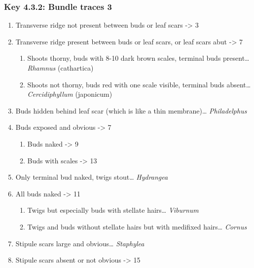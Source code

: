 \documentclass[openany]{book}
\providecommand{\tightlist}{%
  \setlength{\itemsep}{0pt}\setlength{\parskip}{0pt}}
\begin{document}
\hypertarget{key-4.3.2-bundle-traces-3}{%
\subsubsection{Key 4.3.2: Bundle traces
3}\label{key-4.3.2-bundle-traces-3}}

\begin{enumerate}
\def\labelenumi{\arabic{enumi}.}
\tightlist
\item
  Transverse ridge not present between buds or leaf scars
  -\textgreater{} 3
\item
  Transverse ridge present between buds or leaf scars, or leaf scars
  abut -\textgreater{} 7

  \begin{enumerate}
  \def\labelenumii{\arabic{enumii}.}
  \setcounter{enumii}{2}
  \tightlist
  \item
    Shoots thorny, buds with 8-10 dark brown scales, terminal buds
    present\ldots{} \emph{Rhamnus} (cathartica)
  \item
    Shoots not thorny, buds red with one scale visible, terminal buds
    absent\ldots{} \emph{Cercidiphyllum} (japonicum)
  \end{enumerate}
\item
  Buds hidden behind leaf scar (which is like a thin membrane)\ldots{}
  \emph{Philadelphus}
\item
  Buds exposed and obvious -\textgreater{} 7

  \begin{enumerate}
  \def\labelenumii{\arabic{enumii}.}
  \setcounter{enumii}{6}
  \tightlist
  \item
    Buds naked -\textgreater{} 9
  \item
    Buds with scales -\textgreater{} 13
  \end{enumerate}
\item
  Only terminal bud naked, twigs stout\ldots{} \emph{Hydrangea}
\item
  All buds naked -\textgreater{} 11

  \begin{enumerate}
  \def\labelenumii{\arabic{enumii}.}
  \setcounter{enumii}{10}
  \tightlist
  \item
    Twigs but especially buds with stellate hairs\ldots{}
    \emph{Viburnum}
  \item
    Twigs and buds without stellate hairs but with medifixed
    hairs\ldots{} \emph{Cornus}
  \end{enumerate}
\item
  Stipule scars large and obvious\ldots{} \emph{Staphylea}
\item
  Stipule scars absent or not obvious -\textgreater{} 15


\end{enumerate}
\end{document}
